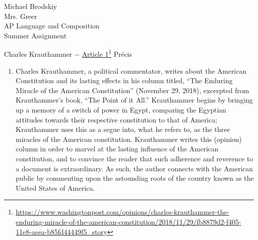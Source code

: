 \documentclass[12pt]{article}
\begin{document}
\setlength{\parindent}{0in}
Michael Brodskiy\\
Mrs. Greer\\
AP Language and Composition\\
Summer Assignment\\


\begin{center}
Charles Krauthammer $-$ \href{https://www.washingtonpost.com/opinions/charles-krauthammer-the-enduring-miracle-of-the-american-constitution/2018/11/29/fb8879d2-f405-11e8-aeea-b85fd44449f5_story}{Article 1}\footnote{\url{https://www.washingtonpost.com/opinions/charles-krauthammer-the-enduring-miracle-of-the-american-constitution/2018/11/29/fb8879d2-f405-11e8-aeea-b85fd44449f5_story}} Pr\'ecis
\end{center}


\setlength{\parindent}{0.5in}

\begin{justify}
\begin{enumerate}

  \item Charles Krauthammer, a political commentator, writes about the American Constitution and its lasting effects in his column titled, ``The Enduring Miracle of the American Constitution'' (November 29, 2018), excerpted from Krauthammer's book, ``The Point of it All.'' Krauthammer begins by bringing up a memory of a switch of power in Egypt, comparing the Egyptian attitudes towards their respective constitution to that of America; Krauthammer uses this as a segue into, what he refers to, as the three miracles of the American constitution. Krauthammer writes this (opinion) column in order to marvel at the lasting influence of the American constitution, and to convince the reader that such adherence and reverence to a document is extraordinary. As such, the author connects with the American public by commenting upon the astounding roots of the country known as the United States of America. 
\end{enumerate}
\end{justify}
\newpage
\end{document}
